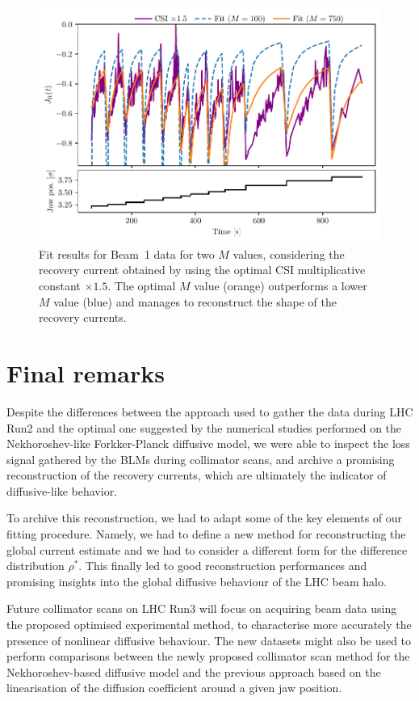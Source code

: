 \begin{figure}[htb]
    \centering
    \includegraphics[trim={0 2.5mm 0 3mm}, clip, width=0.95\columnwidth]{5_Diffusion_measurement_LHC/figs/fifth.pdf}
    \caption{Fit results for Beam~1 data for two $M$ values, considering the recovery current obtained by using the optimal CSI multiplicative constant $\times 1.5$. The optimal $M$ value (orange) outperforms a lower $M$ value (blue) and manages to reconstruct the shape of the recovery currents.}
    \label{fig:fifth}
\end{figure}
%
\section{Final remarks}
%
Despite the differences between the approach used to gather the data during LHC Run2 and the optimal one suggested by the numerical studies performed on the Nekhoroshev-like Forkker-Planck diffusive model, we were able to inspect the loss signal gathered by the BLMs during collimator scans, and archive a promising reconstruction of the recovery currents, which are ultimately the indicator of diffusive-like behavior.

To archive this reconstruction, we had to adapt some of the key elements of our fitting procedure. Namely, we had to define a new method for reconstructing the global current estimate and we had to consider a different form for the difference distribution $\rho^\ast$. This finally led to good reconstruction performances and promising insights into the global diffusive behaviour of the LHC beam halo.

Future collimator scans on LHC Run3 will focus on acquiring beam data using the proposed optimised experimental method, to characterise more accurately the presence of nonlinear diffusive behaviour. The new datasets might also be used to perform comparisons between the newly proposed collimator scan method for the Nekhoroshev-based diffusive model and the previous approach based on the linearisation of the diffusion coefficient around a given jaw position.
